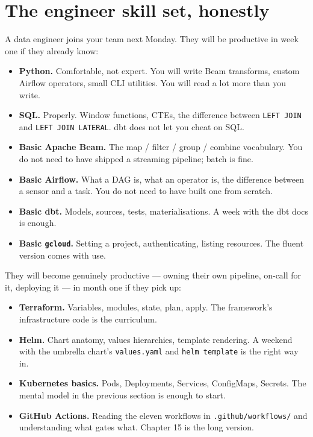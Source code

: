 \documentclass[
  11pt,
  british,
  oneside]{book}
\providecommand{\tightlist}{%
  \setlength{\itemsep}{0pt}\setlength{\parskip}{0pt}}
\begin{document}
\hypertarget{the-engineer-skill-set-honestly}{%
\section{The engineer skill set,
honestly}\label{the-engineer-skill-set-honestly}}

A data engineer joins your team next Monday. They will be productive in
week one if they already know:

\begin{itemize}
\tightlist
\item
  \textbf{Python.} Comfortable, not expert. You will write Beam
  transforms, custom Airflow operators, small CLI utilities. You will
  read a lot more than you write.
\item
  \textbf{SQL.} Properly. Window functions, CTEs, the difference between
  \texttt{LEFT\ JOIN} and \texttt{LEFT\ JOIN\ LATERAL}. dbt does not let
  you cheat on SQL.
\item
  \textbf{Basic Apache Beam.} The map / filter / group / combine
  vocabulary. You do not need to have shipped a streaming pipeline;
  batch is fine.
\item
  \textbf{Basic Airflow.} What a DAG is, what an operator is, the
  difference between a sensor and a task. You do not need to have built
  one from scratch.
\item
  \textbf{Basic dbt.} Models, sources, tests, materialisations. A week
  with the dbt docs is enough.
\item
  \textbf{Basic \texttt{gcloud}.} Setting a project, authenticating,
  listing resources. The fluent version comes with use.
\end{itemize}

They will become genuinely productive --- owning their own pipeline,
on-call for it, deploying it --- in month one if they pick up:

\begin{itemize}
\tightlist
\item
  \textbf{Terraform.} Variables, modules, state, plan, apply. The
  framework's infrastructure code is the curriculum.
\item
  \textbf{Helm.} Chart anatomy, values hierarchies, template rendering.
  A weekend with the umbrella chart's \texttt{values.yaml} and
  \texttt{helm\ template} is the right way in.
\item
  \textbf{Kubernetes basics.} Pods, Deployments, Services, ConfigMaps,
  Secrets. The mental model in the previous section is enough to start.
\item
  \textbf{GitHub Actions.} Reading the eleven workflows in
  \texttt{.github/workflows/} and understanding what gates what. Chapter
  15 is the long version.
\end{itemize}
\end{document}
